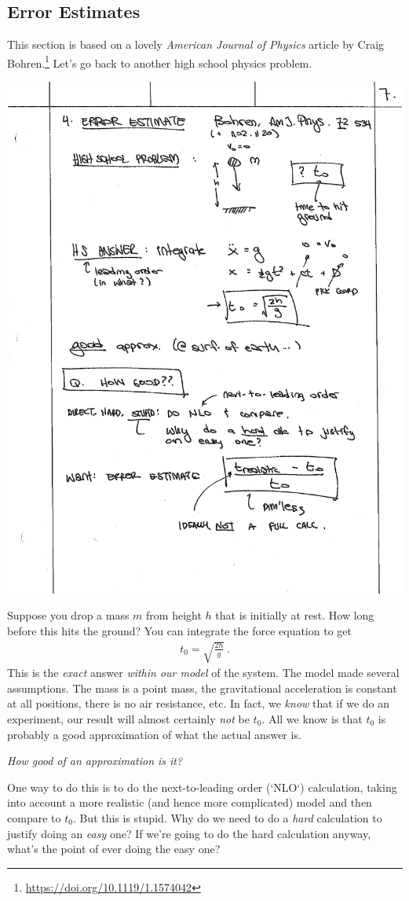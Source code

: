 \subsection{Error Estimates}

This section is based on a lovely \emph{American Journal of Physics} article by Craig Bohren.\footnote{\url{https://doi.org/10.1119/1.1574042}} Let’s go back to another high school physics problem. 

\begin{center}
\includegraphics[width=.4\textwidth]{figures/lec01_drop.pdf}
\end{center}

Suppose you drop a mass $m$ from height $h$ that is initially at rest. How long before this hits the ground? You can integrate the force equation to get
\begin{align}
  t_0 = \sqrt{\frac{2h}{g}} \ .
\end{align}
This is the \emph{exact} answer \emph{within our model} of the system. The model made several assumptions. The mass is a point mass, the gravitational acceleration is constant at all positions, there is no air resistance, etc. In fact, we \emph{know} that if we do an experiment, our result will almost certainly \emph{not} be $t_0$. All we know is that $t_0$ is probably a good approximation of what the actual answer is.

\emph{How good of an approximation is it?}

One way to do this is to do the next-to-leading order (`NLO‘) calculation, taking into account a more realistic (and hence more complicated) model and then compare to $t_0$. But this is stupid. Why do we need to do a \emph{hard} calculation to justify doing an \emph{easy} one? If we’re going to do the hard calculation anyway, what’s the point of ever doing the easy one?

